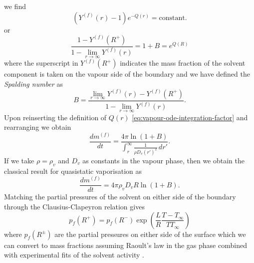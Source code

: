 \documentclass[11pt,twoside]{report}
\begin{document}
we find
\begin{equation*}
  (Y^{(f)}(r) - 1) e^{-Q(r)}
  =
  \textrm{constant}.
\end{equation*}
or
\begin{equation*}
  \frac{1 - Y^{(f)}(R^+)}{\displaystyle{1 - \lim_{r \to \infty}} Y^{(f)}(r)}
  =
  1 + B
  =
  e^{Q(R)}
\end{equation*}
where the superscript in $Y^{(f)}(R^+)$ indicates the mass fraction of the solvent component is taken on the vapour side of the boundary and we have defined the \emph{Spalding number} as
\begin{equation}\label{eq:spalding-number}
  B
  =
  \frac{
    \displaystyle{\lim_{r \to \infty}} Y^{(f)}(r) - Y^{(f)}(R^+)
  }{
    1 - \displaystyle{\lim_{r \to \infty}} Y^{(f)}(r)
  }.
\end{equation}
Upon reinserting the definition of $Q(r)$ \eqref{eq:vapour-ode-integration-factor} and rearranging we obtain 
\begin{equation*}
  \frac{dm^{(f)}}{dt}
  =
  \frac{
    4\pi \ln{(1 + B)}
  }{
    \int_r^\infty  \frac{1}{\rho D_v (r')^2} \, dr'
  }.
\end{equation*}
If we take $\rho = \rho_v$ and $D_v$ as constants in the vapour phase, then we obtain the classical result for quasistatic vaporisation as \cite{Slattery1999,Sirignano2010}
\begin{equation}\label{eq:quasistatic-vaporisation}
  \frac{dm^{(f)}}{dt}
  =
  4\pi \rho_v D_v R \ln{(1 + B)}.
\end{equation}
Matching the partial pressures of the solvent on either side of the boundary through the Clausius-Clapeyron relation gives%
\begin{equation}\label{eq:molar-fraction}
  p_f(R^+)
  =
  p_f(R^-)
  \exp{\left( \frac{L}{R} \frac{T - T_\infty}{T T_\infty} \right)}
\end{equation}
where $p_f(R^\pm)$ are the partial pressures on either side of the surface which we can convert to mass fractions assuming Raoult's law in the gas phase combined with experimental fits of the solvent activity \cite{CleggJPCA1998}.
\end{document}
